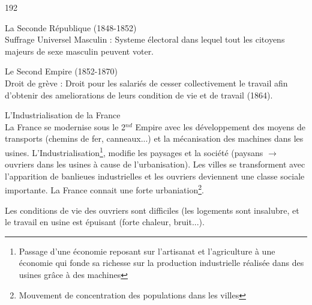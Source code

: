 \documentclass[12pt,a4paper]{article}
\begin{document}
\begin{dingautolist}{192}

\item La Seconde République (1848-1852) \\ 
	Suffrage Universel Masculin : Systeme électoral dans lequel tout les citoyens majeurs de sexe masculin peuvent voter.



\item Le Second Empire (1852-1870) \\
	Droit de grève : Droit pour les salariés de cesser collectivement le travail afin d'obtenir des ameliorations de leurs condition de vie et de travail (1864).

\item L'Industrialisation de la France \\
	La France se modernise sous le 2$^{nd}$	Empire avec les développement des moyens de transports (chemins de fer, canneaux...) et la mécanisation des machines dans les usines.
	L'Industrialisation\footnote{Passage d'une économie reposant sur l'artisanat et l'agriculture à une économie qui fonde sa richesse sur la production industrielle réalisée dans des usines grâce à des machines}, modifie les paysages et la société (paysans $\to$ ouvriers dans les usines à cause de l'urbanisation). 
	Les villes se transforment avec l'apparition de banlieues industrielles et les ouvriers deviennent une classe sociale importante.
	La France connait une forte urbaniation\footnote{Mouvement de concentration des populations dans les villes}.\par
	Les conditions de vie des ouvriers sont difficiles (les logements sont insalubre, et le travail en usine est épuisant (forte chaleur, bruit...).





\end{dingautolist}
\end{document}
